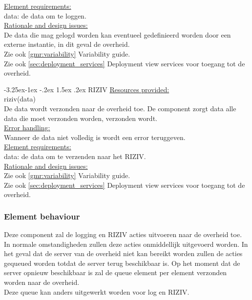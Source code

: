 \documentclass[a4paper,10pt]{article}
\makeatletter
\renewcommand\paragraph{\@startsection{paragraph}{4}{\z@}%
  {-3.25ex\@plus -1ex \@minus -.2ex}%
  {1.5ex \@plus .2ex}%
  {\normalfont\normalsize\bfseries}}
\makeatother
\begin{document}
\underline{Element requirements:}\\
data: de data om te loggen.\\

\underline{Rationale and design issues:}\\
De data die mag gelogd worden kan eventueel gedefinieerd worden door een externe instantie, in dit geval de overheid.\\
Zie ook \ref{gmr:variability} Variability guide.\\
Zie ook \ref{sec:deployment_services} Deployment view services voor toegang tot de overheid.

\paragraph{RIZIV}
\underline{Resources provided:}\\
riziv(data)\\
De data wordt verzonden naar de overheid toe.  De component zorgt data alle data die moet verzonden worden, verzonden wordt.\\

\underline{Error handling:}\\
Wanneer de data niet volledig is wordt een error teruggeven.\\

\underline{Element requirements:}\\
data: de data om te verzenden naar het RIZIV.\\

\underline{Rationale and design issues:}\\
Zie ook \ref{gmr:variability} Variability guide.\\
Zie ook \ref{sec:deployment_services} Deployment view services voor toegang tot de overheid.

\subsubsection*{Element behaviour}
Deze component zal de logging en RIZIV acties uitvoeren naar de overheid toe.  In normale omstandigheden zullen deze acties onmiddellijk uitgevoerd worden.  In het geval dat de server van de overheid niet kan bereikt worden zullen de acties gequeued worden totdat de server terug beschikbaar is.  Op het moment dat de server opnieuw beschikbaar is zal de queue element per element verzonden worden naar de overheid.\\
Deze queue kan anders uitgewerkt worden voor log en RIZIV.
\end{document}
